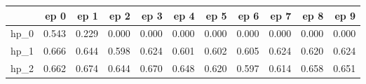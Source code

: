 \begin{tabular}{lrrrrrrrrrr}
\toprule
{} &   ep 0 &   ep 1 &   ep 2 &   ep 3 &   ep 4 &   ep 5 &   ep 6 &   ep 7 &   ep 8 &   ep 9 \\
\midrule
hp\_0 &  0.543 &  0.229 &  0.000 &  0.000 &  0.000 &  0.000 &  0.000 &  0.000 &  0.000 &  0.000 \\
hp\_1 &  0.666 &  0.644 &  0.598 &  0.624 &  0.601 &  0.602 &  0.605 &  0.624 &  0.620 &  0.624 \\
hp\_2 &  0.662 &  0.674 &  0.644 &  0.670 &  0.648 &  0.620 &  0.597 &  0.614 &  0.658 &  0.651 \\
\bottomrule
\end{tabular}
